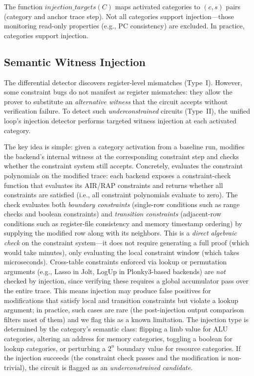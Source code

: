 The function $\textit{injection\_targets}(C)$ maps activated categories to $(c, s)$ pairs (category and anchor trace step). Not all categories support injection---those monitoring read-only properties (e.g., PC consistency) are excluded. In practice,  categories support injection.

\subsection{Semantic Witness Injection}\label{sec:witness-search}

The differential detector discovers register-level mismatches (Type~I). However, some constraint bugs do not manifest as register mismatches: they allow the prover to substitute an \emph{alternative witness} that the circuit accepts without verification failure. To detect such \emph{underconstrained} circuits (Type~II), the unified loop's injection detector performs targeted witness injection at each activated category.

The key idea is simple: given a category activation from a baseline run, \tool modifies the backend's internal witness at the corresponding constraint step and checks whether the constraint system still accepts. Concretely, \tool evaluates the constraint polynomials on the modified trace: each backend exposes a constraint-check function that evaluates its AIR/RAP constraints and returns whether all constraints are satisfied (i.e., all constraint polynomials evaluate to zero). The check evaluates both \emph{boundary constraints} (single-row conditions such as range checks and boolean constraints) and \emph{transition constraints} (adjacent-row conditions such as register-file consistency and memory timestamp ordering) by supplying the modified row along with its neighbors. This is a \emph{direct algebraic check} on the constraint system---it does not require generating a full proof (which would take minutes), only evaluating the local constraint window (which takes microseconds). Cross-table constraints enforced via lookup or permutation arguments (e.g., Lasso in Jolt, LogUp in Plonky3-based backends) are \emph{not} checked by injection, since verifying these requires a global accumulator pass over the entire trace. This means injection may produce false positives for modifications that satisfy local and transition constraints but violate a lookup argument; in practice, such cases are rare (the post-injection output comparison filters most of them) and we flag this as a known limitation. The injection type is determined by the category's semantic class: flipping a limb value for ALU categories, altering an address for memory categories, toggling a boolean for lookup categories, or perturbing a $2^n$ boundary value for resource categories. If the injection succeeds (the constraint check passes and the modification is non-trivial), the circuit is flagged as an \emph{underconstrained candidate}.

